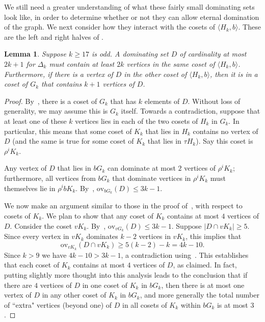 \documentclass{amsart}
\newtheorem{lem}[thm]{Lemma}
\theoremstyle{remark}
\theoremstyle{definition}
\newcommand{\ov}{\mathrm{ov}}
\begin{document}
We still need a greater understanding of what these fairly small dominating sets look like, in order to determine whether or not they can allow eternal domination of the graph. We next consider how they interact with the cosets of $\langle H_k, b \rangle$.
These are the left and right halves of .

\begin{lem}\label{same-coset}
    Suppose $k \ge 17$ is odd. A dominating set $D$ of cardinality at most $2k+1$ for $\Delta_k$ must contain at least $2k$ vertices in the same coset of $\langle H_k,b\rangle$. Furthermore, if there is a vertex of $D$ in the other coset of $\langle H_k,b\rangle$, then it is in a coset of $G_k$ that contains $k+1$ vertices of $D$.
\end{lem}

\begin{proof}
    By~, there is a coset of $G_k$ that has $k$ elements of $D$. Without loss of generality, we may assume this is $G_k$ itself. Towards a contradiction, suppose that at least one of these $k$ vertices lies in each of the two cosets of $H_k$ in $G_k$. In particular, this means that some coset of $K_k$ that lies in $H_k$ contains no vertex of $D$ (and the same is true for some coset of $K_k$ that lies in $\tau H_k$). Say this coset is $\rho^iK_k$.

    Any vertex of $D$ that lies in $bG_k$ can dominate at most $2$ vertices of $\rho^iK_k$; furthermore, all vertices from $bG_k$ that dominate vertices in $\rho^iK_k$ must themselves lie in $\rho^ibK_k$. By~, $\ov_{bG_k}(D) \le 3k-1$. 
    
    We now make an argument similar to those in the proof of~, with respect to cosets of $K_k$. We plan to show that any coset of $K_k$ contains at most $4$ vertices of $D$. Consider the coset $vK_k$. By~, $\ov_{vG_k}(D) \le 3k-1$. Suppose $|D\cap vK_k| \ge 5$. Since every vertex in $vK_k$ dominates $k-2$ vertices in $vK_k$, this implies that $$\ov_{vK_k}(D \cap vK_k) \ge 5(k-2)-k=4k-10.$$ Since $k>9$ we have $4k-10>3k-1$, a contradiction using~. This establishes that each coset of $K_k$ contains at most $4$ vertices of $D$, as claimed. In fact, putting slightly more thought into this analysis leads to the conclusion that if there are $4$ vertices of $D$ in one coset of $K_k$ in $bG_k$, then there is at most one vertex of $D$ in any other coset of $K_k$ in $bG_k$, and more generally the total number of ``extra" vertices (beyond one) of $D$ in all cosets of $K_k$ within $bG_k$ is at most $3$.


\end{proof}
\end{document}
